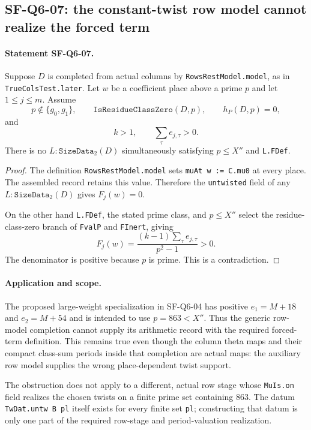 \subsection{SF-Q6-07: the constant-twist row model cannot realize the forced term}

\paragraph{Statement SF-Q6-07.}
Suppose $D$ is completed from actual columns by
\texttt{RowsRestModel.model}, as in
\texttt{TrueColsTest.later}.  Let $w$ be a coefficient place above
a prime $p$ and let $1\le j\le m$.  Assume
\[
 p\notin\{g_0,g_1\},\qquad
 \texttt{IsResidueClassZero}(D,p),\qquad h_P(D,p)=0,
\]
and
\[
 k>1,\qquad \sum_{\tau}e_{j,\tau}>0.
\]
There is no $L:\texttt{SizeData}_2(D)$ simultaneously satisfying
$p\le X''$ and \texttt{L.FDef}.

\begin{proof}
The definition \texttt{RowsRestModel.model} sets
\texttt{muAt w := C.mu0} at every place.  The assembled record
retains this value.  Therefore the \texttt{untwisted} field of
any $L:\texttt{SizeData}_2(D)$ gives $F_j(w)=0$.

On the other hand \texttt{L.FDef}, the stated prime class, and
$p\le X''$ select the residue-class-zero branch of
\texttt{FvalP} and \texttt{FInert}, giving
\[
 F_j(w)=\frac{(k-1)\sum_\tau e_{j,\tau}}{p^2-1}>0.
\]
The denominator is positive because $p$ is prime.  This is a
contradiction.
\end{proof}

\paragraph{Application and scope.}
The proposed large-weight specialization in SF-Q6-04 has positive
$e_1=M+18$ and $e_2=M+54$ and is intended to use $p=863<X''$.
Thus the generic row-model completion cannot supply its arithmetic
record with the required forced-term definition.  This remains true
even though the column theta maps and their compact class-sum
periods inside that completion are actual maps: the auxiliary
row model supplies the wrong place-dependent twist support.

The obstruction does not apply to a different, actual row stage
whose \texttt{MuIs.on} field realizes the chosen twists on a finite
prime set containing $863$.  The datum
\texttt{TwDat.untw B pl} itself exists for every finite set
\texttt{pl}; constructing that datum is only one part of the
required row-stage and period-valuation realization.

